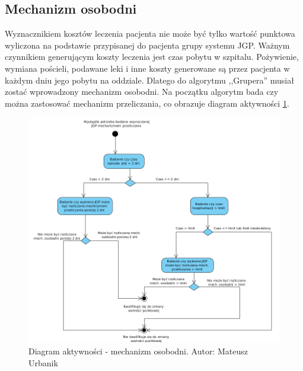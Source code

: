 \subsection{Mechanizm osobodni}
\label{sec:mechanizmOsobodni}
Wyznacznikiem kosztów leczenia pacjenta nie może być tylko wartość punktowa wyliczona na podstawie przypisanej do pacjenta grupy systemu JGP. Ważnym czynnikiem generującym koszty leczenia jest czas pobytu w szpitalu. Pożywienie, wymiana pościeli, podawane leki i inne koszty generowane są przez pacjenta w każdym dniu jego pobytu na oddziale. Dlatego do algorytmu ,,Grupera'' musiał zostać wprowadzony mechanizm osobodni\cite{szkoleniaJGP}. Na początku algorytm bada czy można zastosować mechanizm przeliczania, co obrazuje diagram aktywności \ref{img:diagram_activity_maday}.

\begin{figure}[!ht]
\centering
\includegraphics[scale=0.5]{images/activity-manday}
\caption[Diagram aktywności]{Diagram aktywności - mechanizm osobodni. Autor: Mateusz Urbanik}
\label{img:diagram_activity_maday}
\end{figure}

